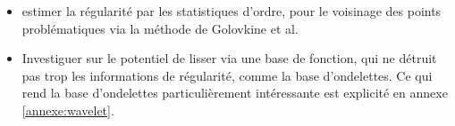 \begin{itemize}
\item estimer la régularité par les statistiques d'ordre, pour le voisinage des points problématiques via la méthode de Golovkine et al.

\bigskip

\item Investiguer sur le potentiel de lisser via une base de fonction, qui ne détruit pas trop les informations de régularité, comme la base d'ondelettes. Ce qui rend la base d'ondelettes particulièrement intéressante est explicité en annexe \ref{annexe:wavelet}.
\end{itemize}
